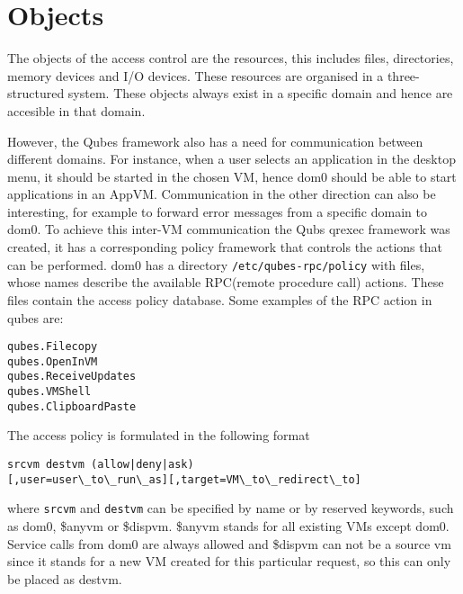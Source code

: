 \documentclass[runningheads,a4paper]{article}
\begin{document}
\section{Objects}

The objects of the access control are the resources, this includes files, directories,
memory devices and I/O devices. These resources are organised in a
three-structured system.  These objects always exist
in a specific domain and hence are accesible in that domain. 

However, the Qubes framework also has a need for communication between
different domains. For instance, when a user selects an application in
the desktop menu, it should be started in the chosen VM, hence dom0
should be able to start applications in an AppVM. Communication in the
other direction can also be interesting, for example to forward error
messages from a specific domain to dom0. To achieve this inter-VM
communication the Qubs qrexec framework was created, it has a
corresponding policy framework that controls the actions that can be
performed. dom0 has a directory \texttt{/etc/qubes-rpc/policy} with
files, whose names describe the available RPC(remote procedure call)
actions. These files contain the access policy database. Some examples
of the RPC action in qubes are:
\begin{verbatim}
qubes.Filecopy
qubes.OpenInVM
qubes.ReceiveUpdates
qubes.VMShell
qubes.ClipboardPaste
\end{verbatim} 
The access policy is formulated in the following format
\begin{verbatim}
srcvm destvm (allow|deny|ask)
[,user=user\_to\_run\_as][,target=VM\_to\_redirect\_to]
\end{verbatim}
where \texttt{srcvm} and \texttt{destvm} can be specified by name or
by reserved keywords, such as dom0, \$anyvm or \$dispvm. \$anyvm
stands for all existing VMs except dom0. Service calls
from dom0 are always allowed and \$dispvm can not be a source vm since
it stands for a new VM created for this particular request, so this
can only be placed as destvm.
\end{document}
